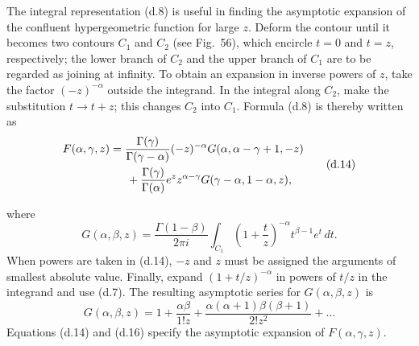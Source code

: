 The integral representation (d.8) is useful in finding the asymptotic
expansion of the confluent hypergeometric function for large $z$. Deform the
contour until it becomes two contours $C_1$ and $C_2$ (see Fig.~56), which
encircle $t=0$ and $t=z$, respectively; the lower branch of $C_2$ and the
upper branch of $C_1$ are to be regarded as joining at infinity. To obtain an
expansion in inverse powers of $z$, take the factor $(-z)^{-\alpha}$ outside
the integrand. In the integral along $C_2$, make the substitution $t\to t+z$;
this changes $C_2$ into $C_1$. Formula (d.8) is thereby written as
\begin{equation}
 \begin{split}
 F(\alpha,\gamma,z)
 &=\frac{\Gamma(\gamma)}{\Gamma(\gamma-\alpha)}
 (-z)^{-\alpha}G(\alpha,\alpha-\gamma+1,-z)\\
 &\hspace{1.5em}+\frac{\Gamma(\gamma)}{\Gamma(\alpha)}
 e^zz^{\alpha-\gamma}G(\gamma-\alpha,1-\alpha,z),
 \end{split}
 \tag{d.14}
\end{equation}

where
\begin{equation}
 G(\alpha,\beta,z)=\frac{\Gamma(1-\beta)}{2\pi i}
 \int_{C_1}\left(1+\frac tz\right)^{-\alpha}t^{\beta-1}e^t\,dt.
 \tag{d.15}
\end{equation}
When powers are taken in (d.14), $-z$ and $z$ must be assigned the arguments
of smallest absolute value. Finally, expand $(1+t/z)^{-\alpha}$ in powers of
$t/z$ in the integrand and use (d.7). The resulting asymptotic series for
$G(\alpha,\beta,z)$ is
\begin{equation}
 G(\alpha,\beta,z)=1+\frac{\alpha\beta}{1!z}
 +\frac{\alpha(\alpha+1)\beta(\beta+1)}{2!z^2}+\ldots
 \tag{d.16}
\end{equation}
Equations (d.14) and (d.16) specify the asymptotic expansion of
$F(\alpha,\gamma,z)$.

